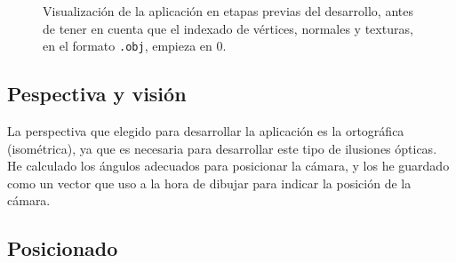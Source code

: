 \documentclass[a4paper,12pt]{article}
\begin{document}
\begin{figure}[h]
    \centering
    \caption{Visualización de la aplicación en etapas previas del desarrollo, antes de tener en cuenta que el indexado de vértices, normales y texturas, en el formato \texttt{.obj}, empieza en 0.} \label{antes_de_corregir_indexado}
\end{figure}

\subsection{Pespectiva y visión}

La perspectiva que elegido para desarrollar la aplicación es la ortográfica (isométrica), ya que es necesaria para desarrollar este tipo de ilusiones ópticas. He calculado los ángulos adecuados para posicionar la cámara, y los he guardado como un vector que uso a la hora de dibujar para indicar la posición de la cámara.

\subsection{Posicionado} \label{posicion}
\end{document}
